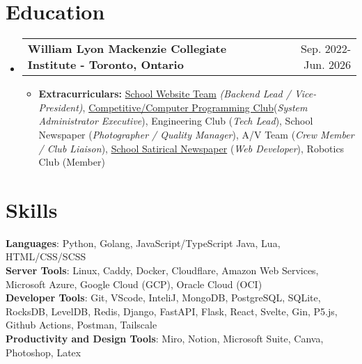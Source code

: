\documentclass[letterpaper,11pt]{article}
\makeatletter
\newcommand{\resumeItem}[1]{
    \item\small{
            {#1 \vspace{-2pt}}
    }
}
\newcommand{\shortResumeSubheading}[2]{%
    \vspace{-2pt}\item
    \begin{tabular*}{0.97\textwidth}[t]{@{}l@{\extracolsep{\fill}}r@{}}
        \textbf{#1} & #2 \\
    \end{tabular*}\vspace{-7pt}%
}
\newcommand{\resumeSubHeadingListStart}{\begin{itemize}[leftmargin=0.15in, label={}]}
\newcommand{\resumeSubHeadingListEnd}{\end{itemize}}
\newcommand{\resumeItemListStart}{\begin{itemize}}
\newcommand{\resumeItemListEnd}{\end{itemize}\vspace{-5pt}}
\makeatother
\begin{document}
\section{Education}
\resumeSubHeadingListStart
\shortResumeSubheading
{William Lyon Mackenzie Collegiate Institute - Toronto, Ontario}{Sep. 2022- Jun. 2026}
\resumeItemListStart
\resumeItem{\textbf{Extracurriculars: }\href{https://maclyonsden.com}{School Website Team}  \emph{(Backend Lead / Vice-President)}, \href{https://mcpt.ca}{Competitive/Computer Programming Club}{(\emph{System Administrator Executive})}, Engineering Club (\emph{Tech Lead}), School Newspaper (\emph{Photographer / Quality Manager}), A/V Team (\emph{Crew Member / Club Liaison}), \href{https://flounder.news}{School Satirical Newspaper} (\emph{Web Developer}), Robotics Club (Member)}
\resumeItemListEnd
\resumeSubHeadingListEnd


\section{Skills}
\small{

\textbf{Languages}{: Python, Golang, JavaScript/TypeScript Java, Lua, HTML/CSS/SCSS} \\
\textbf{Server Tools}{: Linux, Caddy, Docker, Cloudflare, Amazon Web Services, Microsoft Azure, Google Cloud (GCP), Oracle Cloud (OCI)} \\
\textbf{Developer Tools}{: Git, VScode, InteliJ, MongoDB, PostgreSQL, SQLite, RocksDB, LevelDB, Redis, Django, FastAPI, Flask, React, Svelte, Gin, P5.js, Github Actions, Postman, Tailscale} \\
\textbf{Productivity and Design Tools}{: Miro, Notion, Microsoft Suite, Canva, Photoshop, Latex} \\
}
\end{document}
